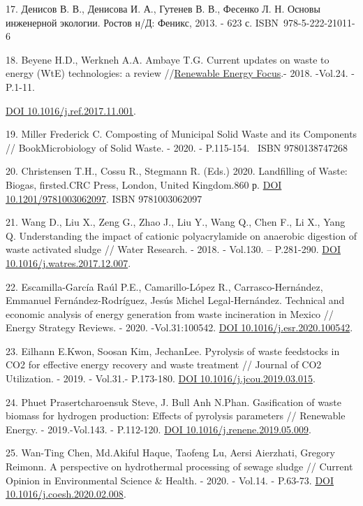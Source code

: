 17. Денисов В. В., Денисова И. А., Гутенев В. В., Фесенко Л. Н. Основы
инженерной экологии. Ростов н/Д: Феникс, 2013. - 623 с.
ISBN~978-5-222-21011-6

18. Beyene H.D., Werkneh A.A. Ambaye T.G. Current updates on waste to
energy (WtE) technologies: a review
//\href{https://www.sciencedirect.com/journal/renewable-energy-focus}{Renewable
Energy Focus}.- 2018. -Vol.24. -P.1-11.

\href{https://doi.org/10.1016/j.ref.2017.11.001}{DOI
10.1016/j.ref.2017.11.001}.

19. Miller Frederick C. Composting of Municipal Solid Waste and its
Components // BookMicrobiology of Solid Waste. - 2020. - P.115-154.
~ISBN 9780138747268

20. Christensen T.H., Cossu R., Stegmann R. (Eds.) 2020. Landfilling of
Waste: Biogas, firsted.CRC Press, London, United Kingdom.860 р.
\href{https://doi.org/10.1201/9781003062097}{DOI 10.1201/9781003062097}.
ISBN 9781003062097

21. Wang D., Liu X., Zeng G., Zhao J., Liu Y., Wang Q., Chen F., Li X.,
Yang Q. Understanding the impact of cationic polyacrylamide on anaerobic
digestion of waste activated sludge // Water Research. - 2018. -
Vol.130. -- P.281-290.
\href{https://doi.org/10.1016/j.watres.2017.12.007}{DOI
10.1016/j.watres.2017.12.007}.

22. Escamilla-García Raúl P.E., Camarillo-López R., Carrasco-Hernández,
Emmanuel Fernández-Rodríguez, Jesús Michel Legal-Hernández. Technical
and economic analysis of energy generation from waste incineration in
Mexico // Energy Strategy Reviews. - 2020. -Vol.31:100542.
\href{https://doi.org/10.1016/j.esr.2020.100542}{DOI
10.1016/j.esr.2020.100542}.

23. Eilhann E.Kwon, Soosan Kim, JechanLee. Pyrolysis of waste feedstocks
in CO2 for effective energy recovery and waste treatment // Journal of
CO2 Utilization. - 2019. - Vol.31.- P.173-180.
\href{https://doi.org/10.1016/j.jcou.2019.03.015}{DOI
10.1016/j.jcou.2019.03.015}.

24. Phuet Prasertcharoensuk Steve, J. Bull Anh N.Phan. Gasification of
waste biomass for hydrogen production: Effects of pyrolysis parameters
// Renewable Energy. - 2019.-Vol.143. - P.112-120.
\href{https://doi.org/10.1016/j.renene.2019.05.009}{DOI
10.1016/j.renene.2019.05.009}.

25. Wan-Ting Chen, Md.Akiful Haque, Taofeng Lu, Aersi Aierzhati, Gregory
Reimonn. A perspective on hydrothermal processing of sewage sludge //
Current Opinion in Environmental Science \& Health. - 2020. - Vol.14. -
P.63-73. \href{https://doi.org/10.1016/j.coesh.2020.02.008}{DOI
10.1016/j.coesh.2020.02.008}.

